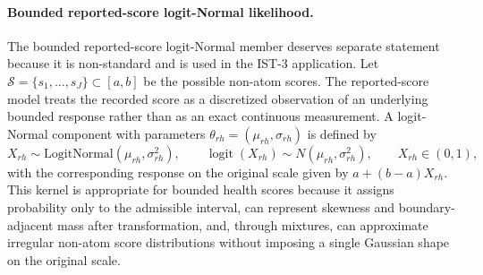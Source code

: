 \documentclass[11pt]{article}
\DeclareMathOperator*{\logit}{logit}
\begin{document}
\paragraph{Bounded reported-score logit-Normal likelihood.}
The bounded reported-score logit-Normal member deserves separate statement because it is non-standard and is used in the IST-3 application. Let $\mathcal{S}=\{s_1,\ldots,s_J\}\subset[a,b]$ be the possible non-atom scores. The reported-score model treats the recorded score as a discretized observation of an underlying bounded response rather than as an exact continuous measurement. A logit-Normal component with parameters $\theta_{rh}=(\mu_{rh},\sigma_{rh})$ is defined by
\[
  X_{rh} \sim \mathrm{LogitNormal}(\mu_{rh},\sigma_{rh}^2),
  \qquad
  \logit(X_{rh}) \sim N(\mu_{rh},\sigma_{rh}^2),
  \qquad
  X_{rh}\in(0,1),
\]
with the corresponding response on the original scale given by $a+(b-a)X_{rh}$. This kernel is appropriate for bounded health scores because it assigns probability only to the admissible interval, can represent skewness and boundary-adjacent mass after transformation, and, through mixtures, can approximate irregular non-atom score distributions without imposing a single Gaussian shape on the original scale.
\end{document}
